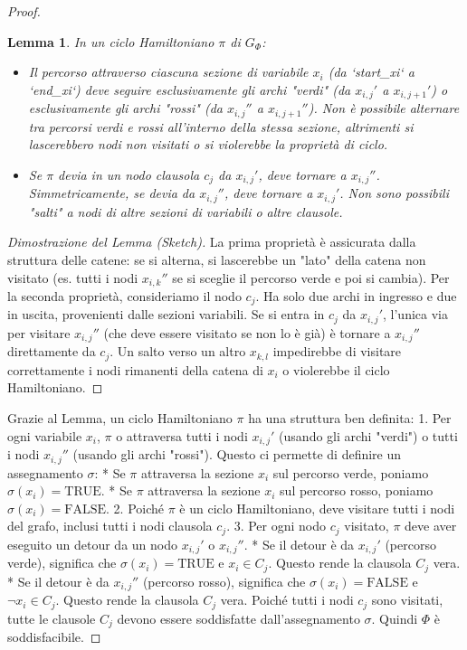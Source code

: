 \documentclass[a4paper]{article}
\newtheorem{lemma}{Lemma}
\begin{document}
\begin{proof}
\begin{lemma}
In un ciclo Hamiltoniano $\pi$ di $G_\Phi$:
\begin{itemize}
    \item Il percorso attraverso ciascuna sezione di variabile $x_i$ (da `start_xi` a `end_xi`) deve seguire esclusivamente gli archi "verdi" (da $x_{i,j}'$ a $x_{i,j+1}'$) o esclusivamente gli archi "rossi" (da $x_{i,j}''$ a $x_{i,j+1}''$). Non è possibile alternare tra percorsi verdi e rossi all'interno della stessa sezione, altrimenti si lascerebbero nodi non visitati o si violerebbe la proprietà di ciclo.
    \item Se $\pi$ devia in un nodo clausola $c_j$ da $x_{i,j}'$, deve tornare a $x_{i,j}''$. Simmetricamente, se devia da $x_{i,j}''$, deve tornare a $x_{i,j}'$. Non sono possibili "salti" a nodi di altre sezioni di variabili o altre clausole.
\end{itemize}
\end{lemma}
\begin{proof}[Dimostrazione del Lemma (Sketch)]
La prima proprietà è assicurata dalla struttura delle catene: se si alterna, si lascerebbe un "lato" della catena non visitato (es. tutti i nodi $x_{i,k}''$ se si sceglie il percorso verde e poi si cambia). Per la seconda proprietà, consideriamo il nodo $c_j$. Ha solo due archi in ingresso e due in uscita, provenienti dalle sezioni variabili. Se si entra in $c_j$ da $x_{i,j}'$, l'unica via per visitare $x_{i,j}''$ (che deve essere visitato se non lo è già) è tornare a $x_{i,j}''$ direttamente da $c_j$. Un salto verso un altro $x_{k,l}$ impedirebbe di visitare correttamente i nodi rimanenti della catena di $x_i$ o violerebbe il ciclo Hamiltoniano.
\end{proof}

Grazie al Lemma, un ciclo Hamiltoniano $\pi$ ha una struttura ben definita:
1.  Per ogni variabile $x_i$, $\pi$ o attraversa tutti i nodi $x_{i,j}'$ (usando gli archi "verdi") o tutti i nodi $x_{i,j}''$ (usando gli archi "rossi"). Questo ci permette di definire un assegnamento $\sigma$:
    *   Se $\pi$ attraversa la sezione $x_i$ sul percorso verde, poniamo $\sigma(x_i) = \text{TRUE}$.
    *   Se $\pi$ attraversa la sezione $x_i$ sul percorso rosso, poniamo $\sigma(x_i) = \text{FALSE}$.
2.  Poiché $\pi$ è un ciclo Hamiltoniano, deve visitare tutti i nodi del grafo, inclusi tutti i nodi clausola $c_j$.
3.  Per ogni nodo $c_j$ visitato, $\pi$ deve aver eseguito un detour da un nodo $x_{i,j}'$ o $x_{i,j}''$.
    *   Se il detour è da $x_{i,j}'$ (percorso verde), significa che $\sigma(x_i)=\text{TRUE}$ e $x_i \in C_j$. Questo rende la clausola $C_j$ vera.
    *   Se il detour è da $x_{i,j}''$ (percorso rosso), significa che $\sigma(x_i)=\text{FALSE}$ e $\neg x_i \in C_j$. Questo rende la clausola $C_j$ vera.
Poiché tutti i nodi $c_j$ sono visitati, tutte le clausole $C_j$ devono essere soddisfatte dall'assegnamento $\sigma$.
Quindi $\Phi$ è soddisfacibile.
\end{proof}
\end{document}
